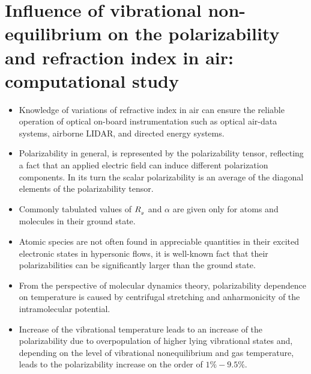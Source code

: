     \section{Influence of vibrational non-equilibrium on the polarizability and refraction index in air: computational study \cite{tropina:jop:2019}}
        \begin{itemize} 
            \item Knowledge of variations of refractive index in air can ensure the reliable operation of optical on-board instrumentation such as optical air-data systems, airborne LIDAR, and directed energy systems.
            \item Polarizability in general, is represented by the polarizability tensor, reflecting a fact that an applied electric field can induce different polarization components. In its turn the scalar polarizability is an average of the diagonal elements of the polarizability tensor. 
            \item Commonly tabulated values of $R_{_{g}}$ and $\alpha$ are given only for atoms and molecules in their ground state. 
            \item Atomic species are not often found in appreciable quantities in their excited electronic states in hypersonic flows, it is well-known fact that their polarizabilities can be significantly larger than the ground state.
            \item From the perspective of molecular dynamics theory, polarizability dependence on temperature is caused by centrifugal stretching and anharmonicity of the intramolecular potential. 
            \item Increase of the vibrational temperature leads to an increase of the polarizability due to overpopulation of higher lying vibrational states and, depending on the level of vibrational nonequilibrium and gas temperature, leads to the polarizability increase on the order of $1\%-9.5\%$. 
        \end{itemize}

        
